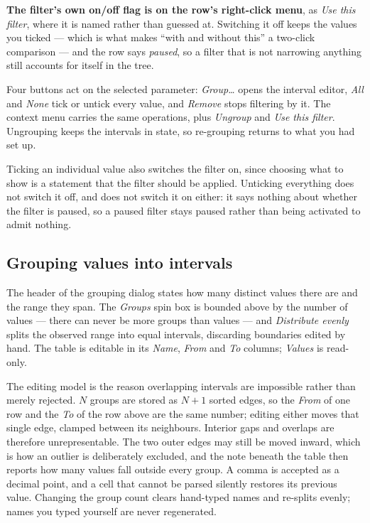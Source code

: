 \documentclass[11pt,a4paper,oneside]{report}
\begin{document}
\textbf{The filter's own on/off flag is on the row's right-click menu}, as
\emph{Use this filter}, where it is named rather than guessed at. Switching it
off keeps the values you ticked --- which is what makes ``with and without
this'' a two-click comparison --- and the row says \emph{paused}, so a filter
that is not narrowing anything still accounts for itself in the tree.

Four buttons act on the selected parameter: \emph{Group\ldots} opens the interval
editor, \emph{All} and \emph{None} tick or untick every value, and \emph{Remove}
stops filtering by it. The context menu carries the same operations, plus
\emph{Ungroup} and \emph{Use this filter}. Ungrouping keeps the intervals in
state, so re-grouping returns to what you had set up.

Ticking an individual value also switches the filter on, since choosing what to
show is a statement that the filter should be applied. Unticking everything does
not switch it off, and does not switch it on either: it says nothing about
whether the filter is paused, so a paused filter stays paused rather than being
activated to admit nothing.

\subsection{Grouping values into intervals}

The header of the grouping dialog states how many distinct values there are and
the range they span. The \emph{Groups} spin box is bounded above by the number of
values --- there can never be more groups than values --- and \emph{Distribute
evenly} splits the observed range into equal intervals, discarding boundaries
edited by hand. The table is editable in its \emph{Name}, \emph{From} and
\emph{To} columns; \emph{Values} is read-only.

The editing model is the reason overlapping intervals are impossible rather than
merely rejected. $N$ groups are stored as $N+1$ sorted edges, so the \emph{From}
of one row and the \emph{To} of the row above are the same number; editing either
moves that single edge, clamped between its neighbours. Interior gaps and
overlaps are therefore unrepresentable. The two outer edges may still be moved
inward, which is how an outlier is deliberately excluded, and the note beneath
the table then reports how many values fall outside every group. A comma is
accepted as a decimal point, and a cell that cannot be parsed silently restores
its previous value. Changing the group count clears hand-typed names and
re-splits evenly; names you typed yourself are never regenerated.
\end{document}

